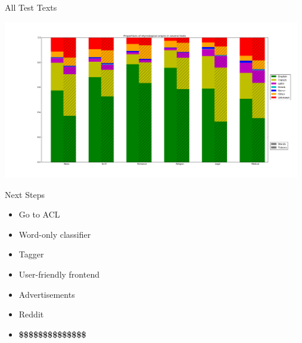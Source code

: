 \documentclass[10pt]{beamer}
\begin{document}
\begin{frame}[fragile]{All Test Texts}
  
  \centerline{\includegraphics[width=13cm]{stackedbarsreversed.png}}

\end{frame}


\begin{frame}[fragile]{Next Steps}

  \begin{itemize}[<+->]
    \item Go to ACL
    \item Word-only classifier
    \item Tagger
    \item User-friendly frontend
    \item Advertisements
    \item Reddit
    \item \textbf{\$\$\$\$\$\$\$\$\$\$\$\$\$\$}
  \end{itemize}


  
\end{frame}
\end{document}
